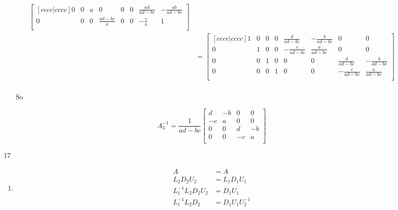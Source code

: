 \documentclass[12pt,letterpaper]{article}
\begin{document}
\begin{enumerate}
\begin{enumerate}
\begin{enumerate}[label=(\alph*)]
\begin{align*}
\begin{bmatrix}[c c c c | c c c c]
                   0 &  0               &  a &  0               &  0                  &  0                   &  \frac{ad}{ad - bc} &  -\frac{ab}{ad - bc} \\
                   0 &  0               &  0 &  \frac{ad-bc}{a} &  0                  &  0                   & -\frac{c}{a}        &  1                   \\
                \end{bmatrix}
                \\
                &=
                \begin{bmatrix}[c c c c | c c c c]
                   1 &  0 &  0 &  0 &  \frac{d}{ad - bc} &  -\frac{b}{ad - bc} &  0                 &  0                  \\
                   0 &  1 &  0 &  0 & -\frac{c}{ad-bc}   &  \frac{a}{ad-bc}    &  0                 &  0                  \\
                   0 &  0 &  1 &  0 &  0                 &  0                  &  \frac{d}{ad - bc} &  -\frac{b}{ad - bc} \\
                   0 &  0 &  0 &  1 &  0                 &  0                  & -\frac{c}{ad-bc}   &  \frac{a}{ad-bc}    \\
                \end{bmatrix}
                \\
              \end{align*}

              So

              \[
                A_3^{-1}
                =
                \frac{1}{ad - bc}
                \begin{bmatrix}
                   d & -b &  0 &  0 \\
                  -c &  a &  0 &  0 \\
                   0 &  0 &  d & -b \\
                   0 &  0 & -c &  a \\
                \end{bmatrix}
              \]
          \end{enumerate}
        \item [17]
          \begin{enumerate}[label=(\alph*)]
            \item
              \begin{align*}
                A &= A \\
                L_2D_2U_2 &= L_1D_1U_1 \\
                L_1^{-1}L_2D_2U_2 &= D_1U_1 \\
                L_1^{-1}L_2D_2 &= D_1U_1U_2^{-1} \\
              \end{align*}


\end{enumerate}
\end{enumerate}
\end{enumerate}
\end{document}
